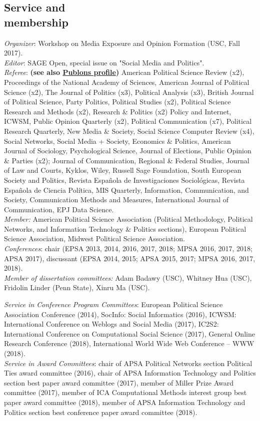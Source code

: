 \documentclass[margin,line,11pt]{resume}
\newcommand{\nl}{\vspace{0.10in}\\}
\begin{document}
\begin{resume}
                \section{\mysidestyle Service and\\membership}
\emph{Organizer}: Workshop on Media Exposure and Opinion Formation (USC, Fall 2017).\nl
\emph{Editor}: SAGE Open, special issue on "Social Media and Politics".\nl
\emph{Referee}: \textbf{(see also \href{https://publons.com/author/1291880/pablo-barbera}{Publons profile})} American Political Science Review (x2), Proceedings of the National Academy of Sciences, American Journal of Political Science (x2), The Journal of Politics (x3), Political Analysis (x3), British Journal of Political Science, Party Politics, Political Studies (x2), Political Science Research and Methods (x2), Research \& Politics (x2) Policy and Internet, ICWSM, Public Opinion Quarterly (x2), Political Communication (x7), Political Research Quarterly, New Media \& Society, Social Science Computer Review (x4), Social Networks, Social Media + Society, Economics \& Politics, American Journal of Sociology, Psychological Science, Journal of Elections, Public Opinion \& Parties (x2); Journal of Communication, Regional \& Federal Studies, Journal of Law and Courts, Kyklos, Wiley, Russell Sage Foundation, South European Society and Politics, Revista Espa\~{n}ola de Investigaciones Sociol\'{o}gicas, Revista Espa\~{n}ola de Ciencia Pol\'{i}tica, MIS Quarterly, Information, Communication, and Society, Communication Methods and Measures, International Journal of Communication, EPJ Data Science.\nl
\emph{Member:} American Political Science Association (Political Methodology, Political Networks, and Information Technology \& Politics sections), European Political Science Association, Midwest Political Science Association.\nl
\emph{Conferences}: chair (EPSA 2013, 2014, 2016, 2017, 2018; MPSA 2016, 2017, 2018; APSA 2017), discussant (EPSA 2014, 2015; APSA 2015, 2017; MPSA 2016, 2017, 2018).\nl
\emph{Member of dissertation committees:} Adam Badawy (USC), Whitney Hua (USC), Fridolin Linder (Penn State), Xinru Ma (USC).

\emph{Service in Conference Program Committees}: European Political Science Association Conference (2014), SocInfo: Social Informatics (2016), ICWSM: International Conference on Weblogs and Social Media (2017), IC2S2: International Conference on Computational Social Science (2017), General Online Research Conference (2018),  International World Wide Web Conference
-- WWW (2018).\nl
\emph{Service in Award Committees}: chair of APSA Political Networks section Political Ties award committee (2016), chair of APSA Information Technology and Politics section best paper award committee (2017), member of Miller Prize Award committee (2017), member of ICA Computational Methods interest group best paper award committee (2018), member of APSA Information Technology and Politics section best conference paper award committee (2018).

\end{resume}
\end{document}
